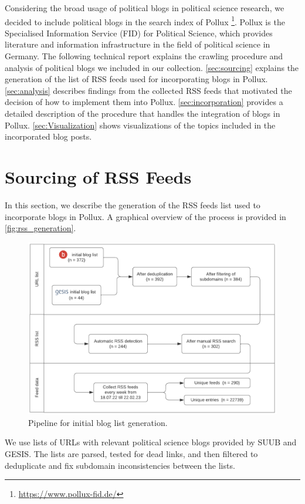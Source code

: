 \documentclass{article}
\newcommand{\Autoref}[1]{%
  \begingroup%
  \def\chapterautorefname{Chapter}%
  \def\sectionautorefname{Section}%
  \def\subsectionautorefname{Subsection}%
  \autoref{#1}%
  \endgroup%
}
\begin{document}
Considering the broad usage of political blogs in political science research, we decided to include political blogs in the search index of Pollux \footnote{\url{https://www.pollux-fid.de/}}. Pollux is the Specialised Information Service (FID) for Political Science, which provides literature and information infrastructure in the field of political science in Germany. The following technical report explains the crawling procedure and analysis of political blogs we included in our collection. \Autoref{sec:sourcing} explains the generation of the list of RSS feeds used for incorporating blogs in Pollux. \Autoref{sec:analysis} describes findings from the collected RSS feeds that motivated the decision of how to implement them into Pollux. \Autoref{sec:incorporation} provides a detailed description of the procedure that handles the integration of blogs in Pollux. \Autoref{sec:Visualization} shows visualizations of the topics included in the incorporated blog posts.

\section{Sourcing of RSS Feeds}\label{sec:sourcing}
In this section, we describe the generation of the RSS feeds list used to incorporate blogs in Pollux. A graphical overview of the process is provided in \autoref{fig:rss_generation}.

\begin{figure}[htb]
    \centering
    \includegraphics[width=.7\textwidth]{figures/generation_of_initial_list.png}
    \caption{Pipeline for initial blog list generation.}
    \label{fig:rss_generation}
\end{figure}

We use lists of URLs with relevant political science blogs provided by SUUB and GESIS. The lists are parsed, tested for dead links, and then filtered to deduplicate and fix subdomain inconsistencies between the lists.
\end{document}
